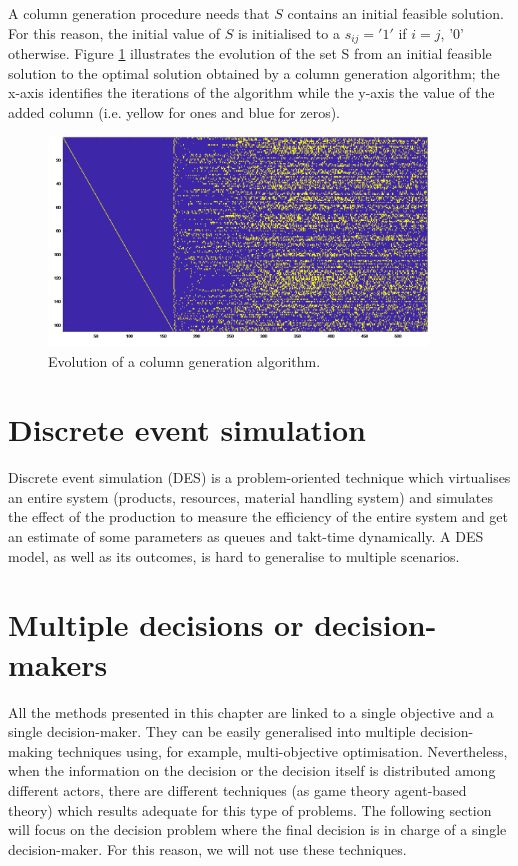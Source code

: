 A column generation procedure needs that $S$ contains an initial feasible solution. For this reason, the initial value of $S$ is initialised to a $s_{ij}='1'$ if $i=j$, '0' otherwise. Figure \ref{fig_columnsGeneration} illustrates the evolution of the set S from an initial feasible solution to the optimal solution obtained by a column generation algorithm; the x-axis identifies the iterations of the algorithm while the y-axis the value of the added column (i.e. yellow for ones and blue for zeros).

\begin{figure}[hbt!]
\centering
\includegraphics[width=0.9\textwidth]{SectionLetsMath/prescriptive_fig/fig_columnsGeneration.png}
\captionsetup{type=figure}
\caption{Evolution of a column generation algorithm.}
\label{fig_columnsGeneration}
\end{figure}

\section{Discrete event simulation}
Discrete event simulation (DES) is a problem-oriented technique which virtualises an entire system (products, resources, material handling system) and simulates the effect of the production to measure the efficiency of the entire system and get an estimate of some parameters as queues and takt-time dynamically. A DES model, as well as its outcomes,  is hard to generalise to multiple scenarios.

\section{Multiple decisions or decision-makers}
All the methods presented in this chapter are linked to a single objective and a single decision-maker. They can be easily generalised into multiple decision-making techniques using, for example, multi-objective optimisation. Nevertheless, when the information on the decision or the decision itself is distributed among different actors, there are different techniques (as game theory agent-based theory) which results adequate for this type of problems. The following section will focus on the decision problem where the final decision is in charge of a single decision-maker. For this reason, we will not use these techniques.